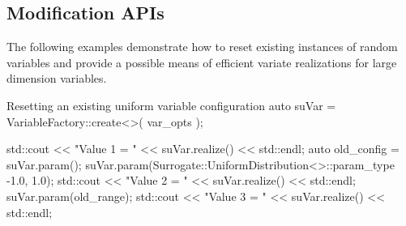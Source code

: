 \subsection{Modification APIs}

The following examples demonstrate how to reset existing instances
of random variables and provide a possible means of efficient variate
realizations for large dimension variables.

\begin{codelisting}{Resetting an existing uniform variable configuration}
  auto suVar = VariableFactory::create<>( var_opts );

  std::cout << "Value 1 = " << suVar.realize() << std::endl;
  auto old_config = suVar.param();
  suVar.param(Surrogate::UniformDistribution<>::param_type {-1.0, 1.0});
  std::cout << "Value 2 = " << suVar.realize() << std::endl;
  suVar.param(old_range);
  std::cout << "Value 3 = " << suVar.realize() << std::endl;
\end{codelisting}


